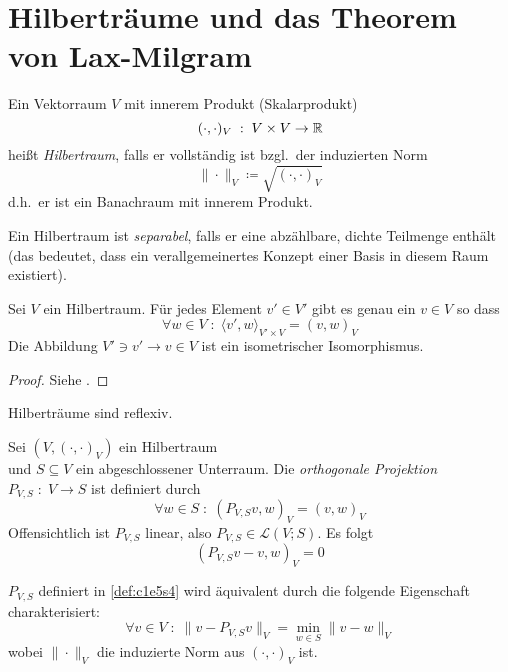 \documentclass[../skript.tex]{subfiles}
\begin{document}
\section{Hilberträume und das Theorem von Lax-Milgram}

\begin{definition} %
\label{def:c1e5s1}
	Ein Vektorraum $V$ mit innerem Produkt (Skalarprodukt) 
	\[
		(\cdot,\cdot)_V \; : \; V\times V\to \mathbb{R}
	\]
	heißt \emph{Hilbertraum}, falls er vollständig ist bzgl.~der induzierten Norm
	\[
		\| \cdot \|_V \coloneqq \sqrt{(\cdot,\cdot)_V}
	\]
	d.h.~er ist ein Banachraum mit innerem Produkt.

	Ein Hilbertraum ist \emph{separabel}, falls er eine abzählbare, dichte Teilmenge enthält (das bedeutet, dass ein verallgemeinertes Konzept einer Basis in diesem Raum existiert).
\end{definition}

\begin{theorem} %
\label{thm:c1e5s2}
	Sei $V$ ein Hilbertraum. Für jedes Element $v'\in V'$ gibt es genau ein $v\in V$ so dass 
	\[
		\forall w\in V \; :\;\langle v', w \rangle_{V'\times V} = \left(v,w\right)_V
	\]
	Die Abbildung $V'\ni v'\to v\in V$ ist ein isometrischer Isomorphismus. 
\end{theorem}

\begin{proof}
	Siehe \cite[S.~90]{Yosida}.
\end{proof}

\begin{corollary} %
\label{thm:c1e5s3}
	Hilberträume sind reflexiv.
\end{corollary}

\begin{definition}
\label{def:c1e5s4}
	Sei $(V,(\cdot,\cdot)_V)$ ein Hilbertraum \\ und $S\subseteq V$ ein abgeschlossener Unterraum. Die \emph{orthogonale Projektion} $P_{V,S} \; : \; V\to S$ ist definiert durch
	\[
		\forall w\in S \; : \; \left(P_{V,S}v,w\right)_V = \left(v,w\right)_V
	\]
	Offensichtlich ist $P_{V,S}$ linear, also $P_{V,S}\in\mathcal{L}(V;S)$. Es folgt
	\[
		\left(P_{V,S}v-v,w\right)_V = 0
	\]
\end{definition}


\begin{proposition} %
\label{prop:c1e5s5}
	$P_{V,S}$ definiert in \cref{def:c1e5s4} wird äquivalent durch die folgende Eigenschaft charakterisiert:
	\[
		\forall v\in V\;:\;\| v-P_{V,S}v \|_V = \min_{w\in S} \| v-w \|_V 
	\]
	wobei $\|\cdot\|_V$ die induzierte Norm aus $(\cdot,\cdot)_V$ ist. 
\end{proposition}
\end{document}
